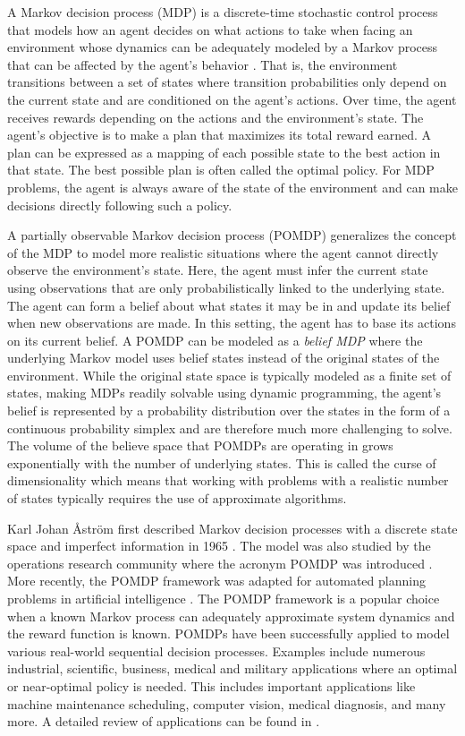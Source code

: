 A Markov decision process (MDP)
is a discrete-time stochastic control process that models
how an agent decides on what actions to take when facing an environment
whose dynamics can be adequately modeled by a Markov process that can be
affected by the agent's behavior \citep{Puterman1994}.
That is, the environment transitions between a set of states
where transition probabilities only depend on the current state and
are conditioned on the agent's actions.
Over time, the agent receives rewards depending on the actions and the
environment's state. The agent's objective is to make a plan that
maximizes its total reward earned.
A plan can be expressed as a mapping of each possible state
to the best action in that state.
The best possible plan is often called the optimal policy.
For MDP problems, the agent is always aware of
the state of the environment and can make decisions directly following such a policy.

A partially observable Markov decision process (POMDP) generalizes the
concept of the MDP to model more realistic situations where the agent
cannot directly observe the environment's state.
Here, the agent must
infer the current state using observations that are only probabilistically linked to
the underlying state. The agent can form a belief about what states
it may be in and update its belief when new observations are made.
In this setting, the agent has to base its actions on its current belief.
A POMDP can be modeled as a \emph{belief MDP} where the underlying Markov model uses belief states instead of the original states of the environment.
While the original state space is typically modeled as a finite set of states, making MDPs readily solvable using dynamic programming, the agent's belief is represented by a probability distribution over the states in the form of a continuous probability simplex
and are therefore much more challenging to solve.
The volume of the believe space that POMDPs are operating in grows
exponentially with the number of underlying states.
This is called the curse of dimensionality which means that working with
problems with a
realistic number of states typically requires the use of approximate algorithms.

Karl Johan Åström first described Markov decision processes with
a discrete state space and imperfect information in 1965
\citep{Astrom1965}. The model was also studied by the operations research community where the acronym POMDP was introduced \citep{Smallwood1973}.
More recently, the POMDP framework was adapted for automated planning problems in artificial intelligence \citep{Kaelbling1998}.
The POMDP framework is a popular choice when a known Markov process can adequately approximate system
dynamics and the reward function is known. POMDPs have been successfully applied to
model various real-world sequential decision processes.
Examples include numerous industrial, scientific, business, medical and military applications where an optimal or near-optimal policy is needed. This includes important applications like machine maintenance scheduling, computer vision, medical diagnosis, and many more. A detailed review of applications can be found in \citep{Cassandra1998b}.

